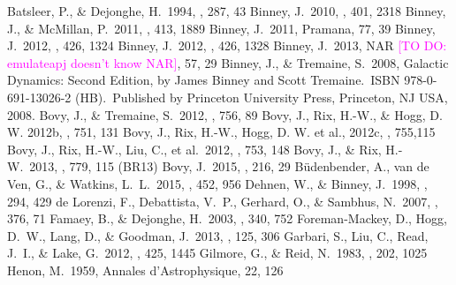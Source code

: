 \documentclass[iop,revtex4]{emulateapj}
\newcommand{\Wilma}[1]{\textcolor{Fuchsia}{#1}}
\begin{document}
%
\begin{thebibliography}{}
 Batsleer, P., \& Dejonghe, H.\ 1994, \aap, 287, 43
 Binney, J.\ 2010, \mnras, 401, 2318
 Binney, J., \& McMillan, P.\ 2011, \mnras, 413, 1889
 Binney, J.\ 2011, Pramana, 77, 39
 Binney, J.\ 2012, \mnras, 426, 1324
 Binney, J.\ 2012, \mnras, 426, 1328
 Binney, J.\ 2013, NAR \Wilma{[TO DO: emulateapj doesn't know NAR]}, 57, 29 
 Binney, J., \& Tremaine, S.\ 2008, Galactic Dynamics: Second Edition, by James Binney and Scott Tremaine.~ISBN 978-0-691-13026-2 (HB).~Published by Princeton University Press, Princeton, NJ USA, 2008.
 Bovy, J., \& Tremaine, S.\ 2012, \apj, 756, 89
 Bovy, J., Rix, H.-W., \& Hogg, D. W. 2012b, \apj, 751, 131
 Bovy, J., Rix, H.-W., Hogg, D. W. et al., 2012c, \apj, 755,115
 Bovy, J., Rix, H.-W., Liu, C., et al.\ 2012, \apj, 753, 148
 Bovy, J., \& Rix, H.-W.\ 2013, \apj, 779, 115 (BR13)
 Bovy, J.\ 2015, \apjs, 216, 29 %
 B{\"u}denbender, A., van de Ven, G., \& Watkins, L.~L.\ 2015, \mnras, 452, 956 
 Dehnen, W., \& Binney, J.\ 1998, \mnras, 294, 429 
 de Lorenzi, F., Debattista, V.~P., Gerhard, O., \& Sambhus, N.\ 2007, \mnras, 376, 71 
 Famaey, B., \& Dejonghe, H.\ 2003, \mnras, 340, 752 
 Foreman-Mackey, D., Hogg, D.~W., Lang, D., \& Goodman, J.\ 2013, \pasp, 125, 306
 Garbari, S., Liu, C., Read, J.~I., \& Lake, G.\ 2012, \mnras, 425, 1445 
 Gilmore, G., \& Reid, N.\ 1983, \mnras, 202, 1025 
 Henon, M.\ 1959, Annales d'Astrophysique, 22, 126 

\end{thebibliography}
\end{document}
